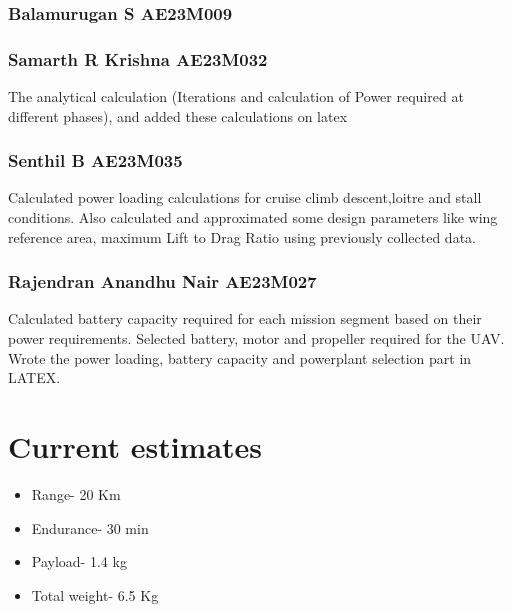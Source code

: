 \documentclass[12 pt]{article}
\begin{document}
\subsubsection{Balamurugan S AE23M009}


\subsubsection{Samarth R Krishna AE23M032}
The analytical calculation (Iterations and calculation of Power required at different phases), and added these calculations on latex


\subsubsection{Senthil B AE23M035}
Calculated power loading calculations for cruise climb descent,loitre and stall conditions. Also calculated and approximated some design parameters like wing reference area, maximum Lift to Drag Ratio using previously collected data.

\subsubsection{Rajendran Anandhu Nair AE23M027}
Calculated battery capacity required for each mission segment based on their power requirements. Selected battery, motor and propeller required for the UAV. Wrote the power loading, battery capacity and powerplant selection part in LATEX. 


\newpage

\section{Current estimates}
\begin{itemize}
    \item Range- 20 Km
    \item Endurance- 30 min
    \item Payload- 1.4 kg
    \item Total weight- 6.5 Kg
\end{itemize}
\end{document}
